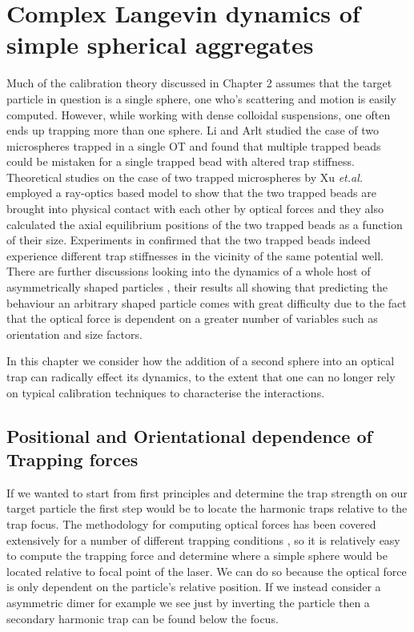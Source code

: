 \chapter{Complex Langevin dynamics of simple spherical aggregates}
Much of the calibration theory discussed in Chapter 2 assumes that the target particle in question is a single sphere, one who's scattering and motion is easily computed. However, while working with dense colloidal suspensions, one often ends up trapping more than one sphere. Li and Arlt \cite{Li2008} studied the case of two microspheres trapped in a single OT and found that multiple trapped beads could be mistaken for a single trapped bead with altered trap stiffness. Theoretical studies on the case of two trapped microspheres by Xu \textit{et.al.} \cite{Xu2005} employed a ray-optics based model to show that the two trapped beads are brought into physical contact with each other by optical forces and they also calculated the axial equilibrium positions of the two trapped beads as a function of their size. Experiments in \cite{Praveen2016} confirmed that the two trapped beads indeed experience different trap stiffnesses in the vicinity of the same potential well. There are further discussions looking into the dynamics of a whole host of asymmetrically shaped particles \cite{Loudet2014, ShengHua2005, Chetana2022}, their results all showing that predicting the behaviour an arbitrary shaped particle comes with great difficulty due to the fact that the optical force is dependent on a greater number of variables such as orientation and size factors.

In this chapter we consider how the addition of a second sphere into an optical trap can radically effect its dynamics, to the extent that one can no longer rely on typical calibration techniques to characterise the interactions.

\section{Positional and Orientational dependence of Trapping forces}
If we wanted to start from first principles and determine the trap strength on our target particle the first step would be to locate the harmonic traps relative to the trap focus. The methodology for computing optical forces has been covered extensively for a number of different trapping conditions \cite{RanhaNeves2019}, so it is relatively easy to compute the trapping force and determine where a simple sphere would be located relative to focal point of the laser. We can do so because the optical force is only dependent on the particle's relative position. If we instead consider a asymmetric dimer for example we see just by inverting the particle then a secondary harmonic trap can be found below the focus.

